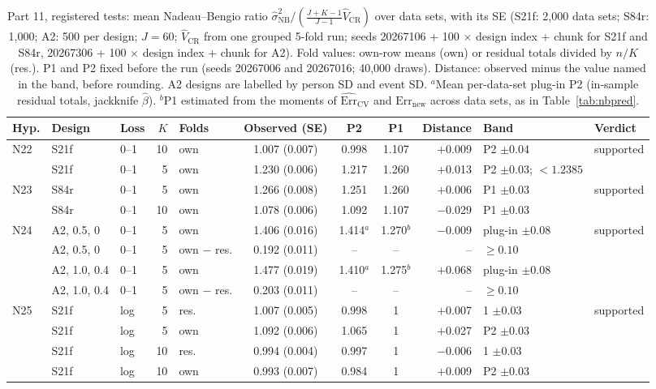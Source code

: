 \documentclass[11pt]{amsart}
\theoremstyle{plain}
\theoremstyle{definition}
\theoremstyle{remark}
\newcommand{\CV}{\widehat{\mathrm{Err}}_{\mathrm{CV}}}
\newcommand{\Errnew}{\mathrm{Err}_{\mathrm{new}}}
\newcommand{\VCR}{\hat V_{\mathrm{CR}}}
\newcommand{\VNB}{\hat\sigma^2_{\mathrm{NB}}}
\newcommand{\fac}{\tfrac{J+K-1}{J-1}}
\begin{document}
\begin{table}[tbp]
\centering\footnotesize
\caption{Part 11, registered tests: mean Nadeau--Bengio ratio $\VNB/(\fac\VCR)$ over data sets, with its SE (S21f: 2,000 data sets; S84r: 1,000; A2: 500 per design; $J=60$; $\VCR$ from one grouped 5-fold run; seeds 20267106 + 100 $\times$ design index + chunk for S21f and S84r, 20267306 + 100 $\times$ design index + chunk for A2). Fold values: own-row means (own) or residual totals divided by $n/K$ (res.). P1 and P2 fixed before the run (seeds 20267006 and 20267016; 40,000 draws). Distance: observed minus the value named in the band, before rounding. A2 designs are labelled by person SD and event SD. $^a$Mean per-data-set plug-in P2 (in-sample residual totals, jackknife $\hat\beta$). $^b$P1 estimated from the moments of $\CV$ and $\Errnew$ across data sets, as in Table~\ref{tab:nbpred}.}\label{tab:unequal}
\begin{tabular}{@{}l l l r l c c c r l l@{}}
\toprule
Hyp. & Design & Loss & $K$ & Folds & Observed (SE) & P2 & P1 & Distance & Band & Verdict\\
\midrule
N22 & S21f & 0--1 & 10 & own & 1.007 (0.007) & 0.998 & 1.107 & $+$0.009 & P2 $\pm$0.04 & supported \\
 & S21f & 0--1 & 5 & own & 1.230 (0.006) & 1.217 & 1.260 & $+$0.013 & P2 $\pm$0.03; $<1.2385$ & \\
\addlinespace
N23 & S84r & 0--1 & 5 & own & 1.266 (0.008) & 1.251 & 1.260 & $+$0.006 & P1 $\pm$0.03 & supported \\
 & S84r & 0--1 & 10 & own & 1.078 (0.006) & 1.092 & 1.107 & $-$0.029 & P1 $\pm$0.03 & \\
\addlinespace
N24 & A2, 0.5, 0 & 0--1 & 5 & own & 1.406 (0.016) & 1.414$^a$ & 1.270$^b$ & $-$0.009 & plug-in $\pm$0.08 & supported \\
 & A2, 0.5, 0 & 0--1 & 5 & own $-$ res. & 0.192 (0.011) & -- & -- & -- & $\ge0.10$ & \\
 & A2, 1.0, 0.4 & 0--1 & 5 & own & 1.477 (0.019) & 1.410$^a$ & 1.275$^b$ & $+$0.068 & plug-in $\pm$0.08 & \\
 & A2, 1.0, 0.4 & 0--1 & 5 & own $-$ res. & 0.203 (0.011) & -- & -- & -- & $\ge0.10$ & \\
\addlinespace
N25 & S21f & log & 5 & res. & 1.007 (0.005) & 0.998 & 1 & $+$0.007 & 1 $\pm$0.03 & supported \\
 & S21f & log & 5 & own & 1.092 (0.006) & 1.065 & 1 & $+$0.027 & P2 $\pm$0.03 & \\
 & S21f & log & 10 & res. & 0.994 (0.004) & 0.997 & 1 & $-$0.006 & 1 $\pm$0.03 & \\
 & S21f & log & 10 & own & 0.993 (0.007) & 0.984 & 1 & $+$0.009 & P2 $\pm$0.03 & \\
\bottomrule
\end{tabular}
\end{table}
\end{document}
